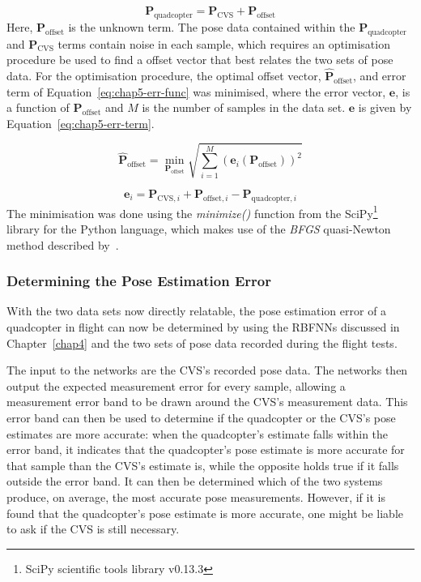 \begin{equation}
  \label{eq:chap5-pose-offset}
  \bm{P}_{\mathrm{quadcopter}} = \bm{P}_{\mathrm{CVS}} + \bm{P}_{\mathrm{offset}}
\end{equation}
Here, $\bm{P}_{\mathrm{offset}}$ is the unknown term. The pose data contained within the $\bm{P}_{\mathrm{quadcopter}}$ and $\bm{P}_{\mathrm{CVS}}$ terms contain noise in each sample, which requires an optimisation procedure be used to find a offset vector that best relates the two sets of pose data. For the optimisation procedure, the optimal offset vector, $\hat{\bm{P}}_{\mathrm{offset}}$, and error term of Equation~\ref{eq:chap5-err-func} was minimised, where the error vector, $\bm{e}$, is a function of $\bm{P}_{\mathrm{offset}}$ and $M$ is the number of samples in the data set. $\bm{e}$ is given by Equation~\ref{eq:chap5-err-term}. 

\begin{equation}
  \label{eq:chap5-err-func}
  \hat{\bm{P}}_{\mathrm{offset}} = \min_{\bm{P}_{\mathrm{offset}}}\sqrt{\displaystyle\sum_{i=1}^{M} (\bm{e}_i(\bm{P}_{\mathrm{offset}}))^2}
\end{equation}

\begin{equation}
  \label{eq:chap5-err-term}
  \bm{e}_i = \bm{P}_{\mathrm{CVS}, i} + \bm{P}_{\mathrm{offset}, i} - \bm{P}_{\mathrm{quadcopter}, i}
\end{equation}
The minimisation was done using the \emph{minimize()} function from the SciPy\footnote{SciPy scientific tools library v0.13.3} library for the Python language, which makes use of the \emph{BFGS} quasi-Newton method described by~\cite{nocedal2006numerical}. 

\subsubsection{Determining the Pose Estimation Error}

With the two data sets now directly relatable, the pose estimation error of a quadcopter in flight can now be determined by using the RBFNNs discussed in Chapter~\ref{chap4} and the two sets of pose data recorded during the flight tests.  

The input to the networks are the CVS's recorded pose data. The networks then output the expected measurement error for every sample, allowing a measurement error band to be drawn around the CVS's measurement data. This error band can then be used to determine if the quadcopter or the CVS's pose estimates are more accurate: when the quadcopter's estimate falls within the error band, it indicates that the quadcopter's pose estimate is more accurate for that sample than the CVS's estimate is, while the opposite holds true if it falls outside the error band. It can then be determined which of the two systems produce, on average, the most accurate pose measurements. However, if it is found that the quadcopter's pose estimate is more accurate, one might be liable to ask if the CVS is still necessary.

